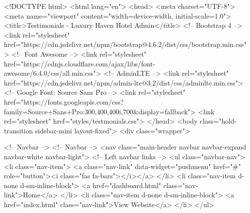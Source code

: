 <!DOCTYPE html>
<html lang="en">
<head>
    <meta charset="UTF-8">
    <meta name="viewport" content="width=device-width, initial-scale=1.0">
    <title>Testimonials - Luxury Haven Hotel Admin</title>
    <!-- Bootstrap 4 -->
    <link rel="stylesheet" href="https://cdn.jsdelivr.net/npm/bootstrap@4.6.2/dist/css/bootstrap.min.css">
    <!-- Font Awesome -->
    <link rel="stylesheet" href="https://cdnjs.cloudflare.com/ajax/libs/font-awesome/6.4.0/css/all.min.css">
    <!-- AdminLTE -->
    <link rel="stylesheet" href="https://cdn.jsdelivr.net/npm/admin-lte@3.2/dist/css/adminlte.min.css">
    <!-- Google Font: Source Sans Pro -->
    <link rel="stylesheet" href="https://fonts.googleapis.com/css?family=Source+Sans+Pro:300,400,400i,700&display=fallback">
    <link rel="stylesheet" href="styles/testmonials.css">
</head>
<body class="hold-transition sidebar-mini layout-fixed">
<div class="wrapper">

    <!-- Navbar -->
  <!-- Navbar -->
    <nav class="main-header navbar navbar-expand navbar-white navbar-light">
        <!-- Left navbar links -->
        <ul class="navbar-nav">
            <li class="nav-item">
                <a class="nav-link" data-widget="pushmenu" href="#" role="button"><i class="fas fa-bars"></i></a>
            </li>
            <li class="nav-item d-none d-sm-inline-block">
                <a href="dashboard.html" class="nav-link">Home</a>
            </li>
            <li class="nav-item d-none d-sm-inline-block">
                <a href="index.html" class="nav-link">View Website</a>
            </li>
        </ul>

